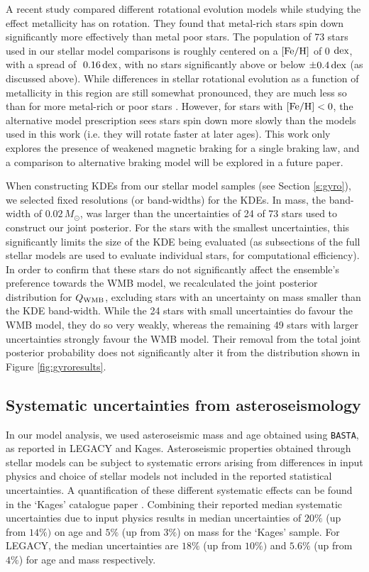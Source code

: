 A recent study \cite{m_amard+matt2020} compared different rotational evolution models \cite[of which we use the former in this work]{m_vansaders+pinsonneault2013,m_matt+2015} while studying the effect metallicity has on rotation. They found that metal-rich stars spin down significantly more effectively than metal poor stars. The population of 73 stars used in our stellar model comparisons is roughly centered on a $\rm{[Fe/H]}$ of 0 $\rm dex$, with a spread of $~0.16\, \rm dex$, with no stars significantly above or below $\pm 0.4\, \rm dex$ (as discussed above). While differences in stellar rotational evolution as a function of metallicity in this region are still somewhat pronounced, they are much less so than for more metal-rich or poor stars \cite[see Figure 2]{m_amard+matt2020}. However, for stars with $\mbox{$\rm{[Fe/H]}$} < 0$, the alternative model prescription \cite{m_matt+2015} sees stars spin down more slowly than the models used in this work (i.e. they will rotate faster at later ages). This work only explores the presence of weakened magnetic braking for a single braking law, and a comparison to alternative braking model will be explored in a future paper.

When constructing KDEs from our stellar model samples (see Section \ref{s:gyro}), we selected fixed resolutions (or band-widths) for the KDEs. In mass, the band-width of $0.02\, M_\odot$, was larger than the uncertainties of 24 of 73 stars used to construct our joint posterior. For the stars with the smallest uncertainties, this significantly limits the size of the KDE being evaluated (as subsections of the full stellar models are used to evaluate individual stars, for computational efficiency). In order to confirm that these stars do not significantly affect the ensemble's preference towards the WMB model, we recalculated the joint posterior distribution for $Q_{\rm WMB}$, excluding stars with an uncertainty on mass smaller than the KDE band-width. While the 24 stars with small uncertainties do favour the WMB model, they do so very weakly, whereas the remaining 49 stars with larger uncertainties strongly favour the WMB model. Their removal from the total joint posterior probability does not significantly alter it from the distribution shown in Figure \ref{fig:gyroresults}.

\subsection{Systematic uncertainties from asteroseismology}
In our model analysis, we used asteroseismic mass and age obtained using \texttt{BASTA}, as reported in LEGACY and Kages. Asteroseismic properties obtained through stellar models can be subject to systematic errors arising from differences in input physics and choice of stellar models not included in the reported statistical uncertainties. A quantification of these different systematic effects can be found in the `Kages' catalogue paper \cite{m_silvaaguirre+2015}. Combining their reported median systematic uncertainties due to input physics results in median uncertainties of $20\%$ (up from $14\%)$ on age and $5\%$ (up from $3\%$) on mass for the `Kages' sample. For LEGACY, the median uncertainties are $18\%$ (up from $10\%)$ and $5.6\%$ (up from $4\%$) for age and mass respectively.

